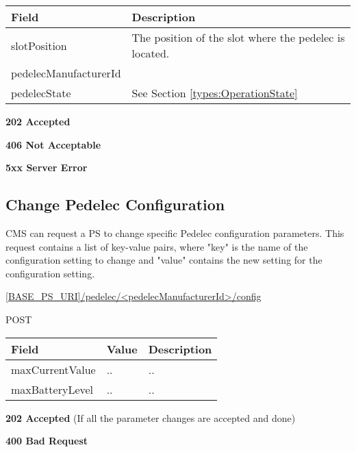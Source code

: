 \begin{table}[!h]
\vspace{-7mm}
\begin{tabularx}{\linewidth}{ | l | X | }
  \hline
  \rowcolor{table-head}
  Field & Description \\
  \hline
  slotPosition	& The position of the slot where the pedelec is located. \\
  pedelecManufacturerId		&  \\
  pedelecState 			& See Section \ref{types:OperationState} \\
  \hline
\end{tabularx}
\end{table}

 \textbf{202 Accepted}

 \textbf{406 Not Acceptable}

\textbf{5xx Server Error}

\subsection{Change Pedelec Configuration}
\label{cms:change-pedelec-conf}

\acs{CMS} can request a \acs{PS} to change specific Pedelec configuration parameters. This request contains a list of key-value pairs, where "key" is the name of the configuration setting to change and "value" contains the new setting for the configuration setting.

 \url{[BASE_PS_URI]/pedelec/<pedelecManufacturerId>/config}

 POST

\newpage
{} 
\begin{table}[!h]
\vspace{-7mm}
\begin{tabularx}{\linewidth}{ | l | l | X | }
  \hline
  \rowcolor{table-head}
  Field & Value & Description \\
  \hline
	maxCurrentValue & .. & .. \\
	maxBatteryLevel & .. & .. \\
  \hline
\end{tabularx}
\end{table}

\textbf{202 Accepted} (If all the parameter changes are accepted and done)

 \textbf{400 Bad Request}

